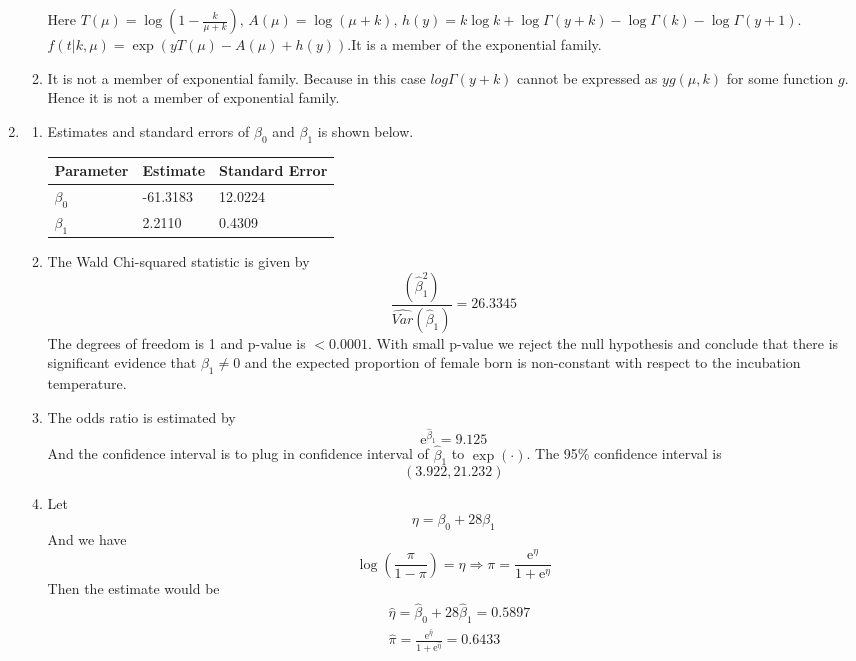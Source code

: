 \documentclass{article}
\begin{document}
\begin{enumerate}[leftmargin = 0 em, label = \arabic*., font = \bfseries]
\begin{enumerate}
		Here $T(\mu) = \log \left( 1 - \frac{k}{\mu + k}\right),\, A(\mu) = \log ( \mu + k),\, h(y) = k \log k + \log \Gamma (y + k) - \log \Gamma(k) - \log \Gamma(y + 1)$. $f(t|k, \mu) = \exp(y T(\mu) - A(\mu) + h(y))$.It is a member of the exponential family.
		
		\item It is not a member of exponential family. Because in this case $log \Gamma (y + k)$ cannot be expressed as $y g(\mu, k)$ for some function $g$. Hence it is not a member of exponential family.
	\end{enumerate}

	\item 
	\begin{enumerate}
		\item 
	Estimates and standard errors of $\beta_0$ and $\beta_1$ is shown below.
	\begin{center}
	\begin{tabular}{lll}
	\toprule
	 \textbf{Parameter} &\textbf{Estimate} &\textbf{Standard Error}\\ 
     \midrule
     $\beta_0$ &-61.3183 &12.0224 \\
     $\beta_1$ &2.2110   &0.4309\\ 
 	\bottomrule
	\end{tabular}
	\end{center}
	\item 
	The Wald Chi-squared statistic is given by 
	\[\frac{(\hat{\beta}_1^2)}{\widehat{Var}(\hat{\beta}_1)} = 26.3345\]
	The degrees of freedom is 1 and p-value is $< 0.0001$. With small p-value we reject the null hypothesis and conclude that there is significant evidence that $\beta_1 \neq 0$ and the expected proportion of female born is non-constant with respect to the incubation temperature.
	
	\item 
	The odds ratio is estimated by
	\[\mathrm{e}^{\hat{\beta}_1} = 9.125\]
	And the confidence interval is to plug in confidence interval of $\hat{\beta}_1$ to $\exp(\cdot)$. The 95\% confidence interval is 
	\[(3.922, 21.232)\]


	\item 
	Let 
	\[\eta = \beta_0 + 28 \beta_1\]
	And we have
	\[\log\left(\frac{\pi}{1 - \pi}\right) = \eta \Rightarrow \pi = \frac{\mathrm{e}^{\eta}}{1 + \mathrm{e}^{\eta}}\]
	Then the estimate would be 
	\begin{align*}
	& \hat{\eta} = \hat{\beta}_0 + 28 \hat{\beta}_1 = 0.5897\\
	& \hat{\pi} = \frac{\mathrm{e}^{\hat{\eta}}}{1 + \mathrm{e}^{\hat{\eta}}} = 0.6433
	\end{align*}


\end{enumerate}
\end{enumerate}
\end{document}

